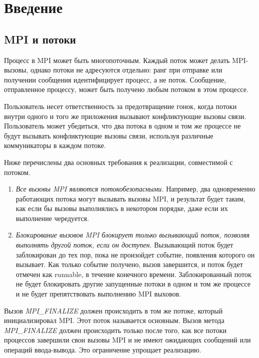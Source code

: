 \chapter{Введение}
\section{MPI и потоки}
	
	Процесс в MPI может быть многопоточным. 
	Каждый поток может делать MPI-вызовы, однако потоки не адресуются отдельно: ранг при отправке или получении сообщения идентифицирует процесс, а не поток. 
	Сообщение, отправленное процессу, может быть получено любым потоком в этом процессе.
	 
	Пользователь несет ответственность за предотвращение гонок, когда потоки внутри одного и того же приложения вызывают конфликтующие вызовы связи. 
	Пользователь может убедиться, что два потока в одном и том же процессе не будут вызывать конфликтующие вызовы связи, используя различные коммуникаторы в каждом потоке.
	
	Ниже перечислены два основных требования к реализации, совместимой с потоком. 
	\begin{enumerate}
		\item \textit{Все вызовы MPI являются потокобезопасными.} 
		Например, два одновременно работающих потока могут вызывать вызовы MPI, и результат будет таким, как если бы вызовы выполнялись в некотором порядке, даже если их выполнение чередуется.
		\item \textit{Блокирование вызовов MPI блокирует только вызывающий поток, позволяя выполнять другой поток, если он доступен.} 
		Вызывающий поток будет заблокирован до тех пор, пока не произойдет событие, появления которого он вызывает. 
		Как только событие получено, вызов завершится, и поток будет отмечен как runnable, в течение конечного времени. Заблокированный поток не будет блокировать другие запущенные потоки в одном и том же процессе и не будет препятствовать выполнению MPI выховов.
	\end{enumerate}

	Вызов \textit{MPI\_FINALIZE} должен происходить в том же потоке, который инициализировал MPI. 
	Этот поток называется основным. 
	Вызов метода \textit{MPI\_FINALIZE} должен происходить только после того, как все потоки процессов завершили свои вызовы MPI и не имеют ожидающих сообщений или операций ввода-вывода. 
	Это ограничение упрощает реализацию.
	
